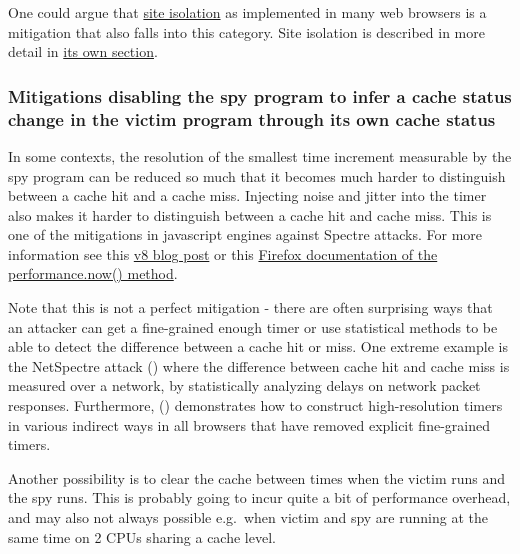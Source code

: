 \documentclass[
  a4paper,
]{report}
\begin{document}
One could argue that
\href{https://developer.chrome.com/blog/site-isolation/}{\label{__index_entry_139}{site
isolation}} as implemented in many web browsers is
a mitigation that also falls into this category. Site isolation is
described in more detail in \hyperref[site-isolation]{its own section}.

\subsubsection{Mitigations disabling the spy program to infer a cache
status change in the victim program through its own cache
status}\label{mitigations-disabling-the-spy-program-to-infer-a-cache-status-change-in-the-victim-program-through-its-own-cache-status}

In some contexts, the resolution of the smallest time increment
measurable by the spy program can be reduced so much that it becomes
much harder to distinguish between a cache hit and a cache miss.
Injecting noise and jitter into the timer also makes it harder to
distinguish between a cache hit and cache miss. This is one of the
mitigations in javascript engines against Spectre attacks. For more
information see this \href{https://v8.dev/blog/spectre}{v8 blog post} or
this
\href{https://developer.mozilla.org/en-US/docs/Web/API/Performance/now}{Firefox
documentation of the performance.now()
method}\label{__index_entry_140}{}.

Note that this is not a perfect mitigation - there are often surprising
ways that an attacker can get a fine-grained enough timer or use
statistical methods to be able to detect the difference between a cache
hit or miss. One extreme example is the
\label{__index_entry_141}{NetSpectre}
attack () where the
difference between cache hit and cache miss is measured over a network,
by statistically analyzing delays on network packet responses.
Furthermore, ()
demonstrates how to construct high-resolution timers in various indirect
ways in all browsers that have removed explicit fine-grained timers.

Another possibility is to clear the cache between times when the victim
runs and the spy runs. This is probably going to incur quite a bit of
performance overhead, and may also not always possible e.g.~when victim
and spy are running at the same time on 2 CPUs sharing a cache level.
\end{document}
